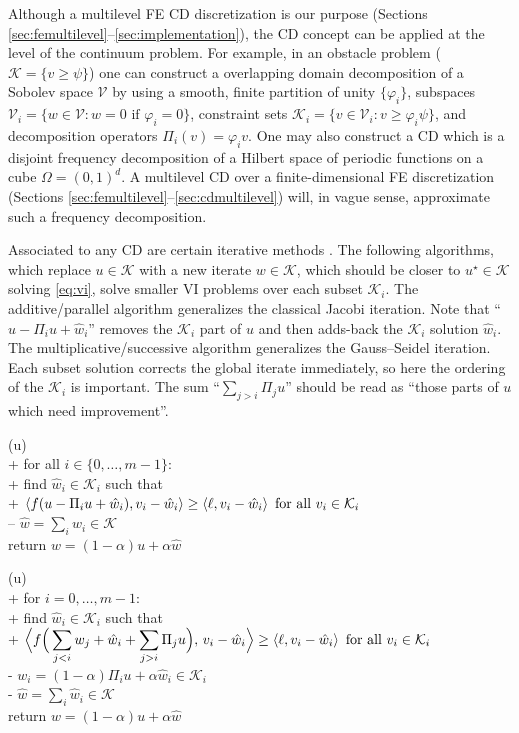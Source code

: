 \documentclass[review,hidelinks,onefignum,onetabnum]{siamart220329}
\newcommand{\cK}{\mathcal{K}}
\newcommand{\cV}{\mathcal{V}}
\newcommand{\ip}[2]{\left<#1,#2\right>}
\begin{document}
Although a multilevel FE CD discretization is our purpose (Sections \ref{sec:femultilevel}--\ref{sec:implementation}), the CD concept can be applied at the level of the continuum problem.  For example, in an obstacle problem ($\cK = \{v \ge \psi\}$) one can construct a overlapping domain decomposition of a Sobolev space $\cV$ by using a smooth, finite partition of unity $\{\varphi_i\}$, subspaces $\cV_i = \{w \in \cV : w = 0 \text{ if } \varphi_i = 0\}$, constraint sets $\cK_i = \{v \in \cV_i : v \ge \varphi_i \psi\}$, and decomposition operators $\Pi_i(v) = \varphi_i v$.  One may also construct a CD which is a disjoint frequency decomposition of a Hilbert space of periodic functions on a cube $\Omega=(0,1)^d$.  A multilevel CD over a finite-dimensional FE discretization (Sections \ref{sec:femultilevel}--\ref{sec:cdmultilevel}) will, in vague sense, approximate such a frequency decomposition.

Associated to any CD are certain iterative methods \cite{Tai2003,Xu1992}.  The following algorithms, which replace $u \in \cK$ with a new iterate $w\in\cK$, which should be closer to $u^\star \in \cK$ solving \eqref{eq:vi}, solve smaller VI problems over each subset $\cK_i$.  The additive/parallel  algorithm generalizes the classical Jacobi iteration.  Note that ``$u-\Pi_iu+\hat w_i$'' removes the $\mathcal{K}_i$ part of $u$ and then adds-back the $\mathcal{K}_i$ solution $\hat w_i$.  The multiplicative/successive  algorithm generalizes the Gauss--Seidel iteration.  Each subset solution corrects the global iterate immediately, so here the ordering of the $\cK_i$ is important.  The sum ``$\sum_{j>i} \Pi_j u$'' should be read as ``those parts of $u$ which need improvement''.

\begin{pseudo*}
(u)\text{:} \\+
    for all $i \in \{0,\dots,m-1\}$: \\+
        \rm{find} $\hat w_i\in \cK_i$ \rm{such that} \\+
            $\ip{f(u - \Pi_i u + \hat w_i)}{v_i-\hat w_i} \ge \ip{\ell}{v_i-\hat w_i} \textnormal{ for all } v_i \in \cK_i$ \\--
    $\hat w = \sum_i \hat w_i\in\cK$ \\
    return $w=(1-\alpha) u + \alpha \hat w$
\end{pseudo*}

\begin{pseudo*}
(u)\text{:} \\+
    for $i = 0,\dots,m-1$: \\+
        \rm{find} $\hat w_i\in \cK_i$ \rm{such that} \\+
            $\displaystyle \Big<f\Big(\sum_{j<i} w_j + \hat w_i + \sum_{j>i} \Pi_j u\Big),\, v_i-\hat w_i\Big> \ge \ip{\ell}{v_i-\hat w_i} \textnormal{ for all } v_i \in \cK_i$ \\-
            $w_i = (1-\alpha) \Pi_i u + \alpha \hat w_i\in\cK_i$ \\-
    $\hat w = \sum_i \hat w_i\in\cK$ \\
    return $w=(1-\alpha) u + \alpha \hat w$
\end{pseudo*}
\end{document}
